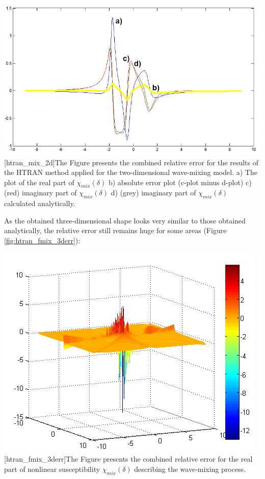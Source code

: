 \documentclass[12pt,twoside,a4paper]{article}
\numberwithin{equation}{subsection}
\numberwithin{figure}{subsection}
\begin{document}
\begin{center}
  \includegraphics[width=150mm]{img/htran_fmix_2d.png}
  [htran_mix_2d]{The Figure presents the combined relative error for the results of the HTRAN method applied for the
  two-dimensional wave-mixing model.
   a) The plot of the real part of ${\chi_{mix}}(\delta )$
   b) absolute error plot (c-plot minus d-plot)
   c) (red) imaginary part of  ${\chi_{mix}}(\delta )$
   d) (grey) imaginary part of ${\chi_{mix}}(\delta )$ calculated analytically.
   \label{fig:htran_mix_2d} 
   }
\end{center}

As the obtained three-dimensional shape looks very similar to those obtained analytically, the relative error still remains huge for some
areas (Figure \ref{fig:htran_fmix_3derr}):

\begin{center}
  \includegraphics{img/htran_fmix_3derr.png}
  [htran_fmix_3derr]{The Figure presents the combined relative error for the real part of nonlinear susceptibility
  ${\chi_{mix}}(\delta )$ describing the wave-mixing process. }
  \label{fig:htran_fmix_3derr}
\end{center}
\end{document}
